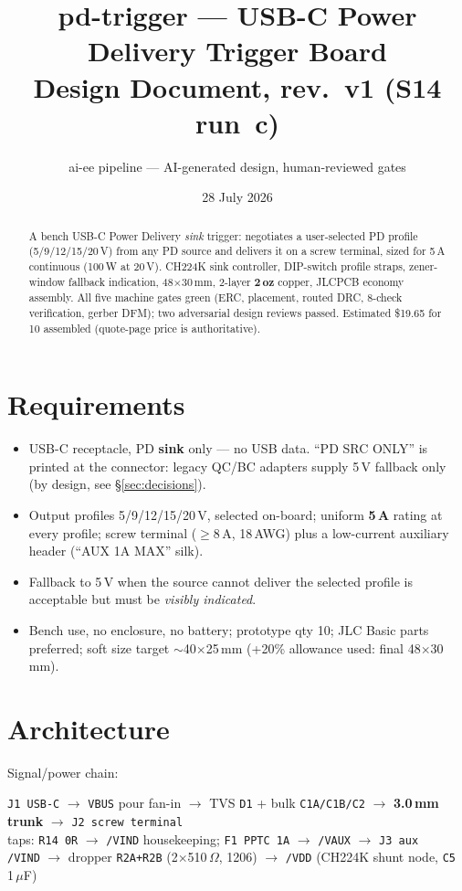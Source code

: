 \documentclass[11pt,a4paper]{article}
\title{\textbf{pd-trigger} --- USB-C Power Delivery Trigger Board\\
\large Design Document, rev.\ v1 (S14 run~c)}
\author{ai-ee pipeline --- AI-generated design, human-reviewed gates}
\date{28 July 2026}
\newcommand{\net}[1]{\texttt{#1}}
\begin{document}
\maketitle

\begin{abstract}
\noindent A bench USB-C Power Delivery \emph{sink} trigger: negotiates a
user-selected PD profile (5/9/12/15/20\,V) from any PD source and delivers
it on a screw terminal, sized for 5\,A continuous (100\,W at 20\,V).
CH224K sink controller, DIP-switch profile straps, zener-window fallback
indication, 48$\times$30\,mm, 2-layer \textbf{2\,oz} copper, JLCPCB economy
assembly. All five machine gates green (ERC, placement, routed DRC,
8-check verification, gerber DFM); two adversarial design reviews passed.
Estimated \$19.65 for 10 assembled (quote-page price is authoritative).
\end{abstract}

\section{Requirements}
\begin{itemize}\itemsep2pt
  \item USB-C receptacle, PD \textbf{sink} only --- no USB data. ``PD SRC
        ONLY'' is printed at the connector: legacy QC/BC adapters supply
        5\,V fallback only (by design, see \S\ref{sec:decisions}).
  \item Output profiles 5/9/12/15/20\,V, selected on-board; uniform
        \textbf{5\,A} rating at every profile; screw terminal
        ($\geq$8\,A, 18\,AWG) plus a low-current auxiliary header
        (``AUX 1A MAX'' silk).
  \item Fallback to 5\,V when the source cannot deliver the selected
        profile is acceptable but must be \emph{visibly indicated}.
  \item Bench use, no enclosure, no battery; prototype qty 10; JLC Basic
        parts preferred; soft size target $\sim$40$\times$25\,mm (+20\%
        allowance used: final 48$\times$30\,mm).
\end{itemize}

\section{Architecture}
Signal/power chain:
\begin{center}
\small
\net{J1 USB-C} $\rightarrow$ \net{VBUS} pour fan-in $\rightarrow$
TVS \net{D1} + bulk \net{C1A/C1B/C2} $\rightarrow$
\textbf{3.0\,mm trunk} $\rightarrow$ \net{J2 screw terminal}\\[2pt]
taps: \net{R14 0R} $\rightarrow$ \net{/VIND} housekeeping;\quad
\net{F1 PPTC 1A} $\rightarrow$ \net{/VAUX} $\rightarrow$ \net{J3 aux}\\[2pt]
\net{/VIND} $\rightarrow$ dropper \net{R2A+R2B} (2$\times$510\,$\Omega$,
1206) $\rightarrow$ \net{/VDD} (CH224K shunt node, \net{C5} 1\,$\mu$F)
\end{center}
\end{document}
